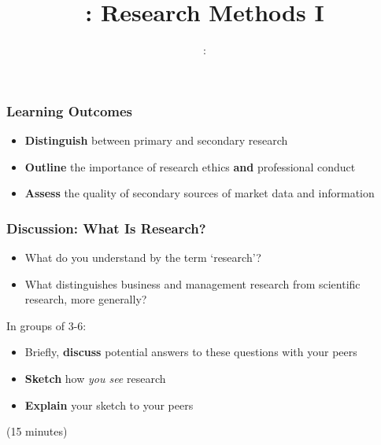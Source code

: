 \usepackage{../../beamerthemeFalmouthGamesAcademy}
\usepackage{multimedia}
\graphicspath{ {../../} }


\usepackage[normalem]{ulem}
\usepackage{wasysym}

\usepackage{pdfpages}

\usetikzlibrary{arrows,automata}




\title{\sessionnumber: Research Methods I}
\subtitle{\modulecode: \moduletitle}

\frame{\titlepage} 

\begin{frame}
	\frametitle{Learning Outcomes}
	\begin{itemize}
		\item \textbf{Distinguish} between primary and secondary research
		\item \textbf{Outline} the importance of research ethics \textbf{and} professional conduct
		\item \textbf{Assess} the quality of secondary sources of market data and information
	\end{itemize}
\end{frame}

\begin{frame}
	\frametitle{Discussion: What Is Research?}
	
	\begin{itemize}
		\item What do you understand by the term ‘research’?
		\item What distinguishes business and management research from scientific research, more generally? 
	\end{itemize}
	
	\vspace{2em}
	
	In groups of 3-6:
	
	\begin{itemize}
		\item Briefly, \textbf{discuss} potential answers to these questions with your peers
		\item \textbf{Sketch} how \textit{you see} research
		\item \textbf{Explain} your sketch to your peers
	\end{itemize}
	
	(15 minutes)
\end{frame}

